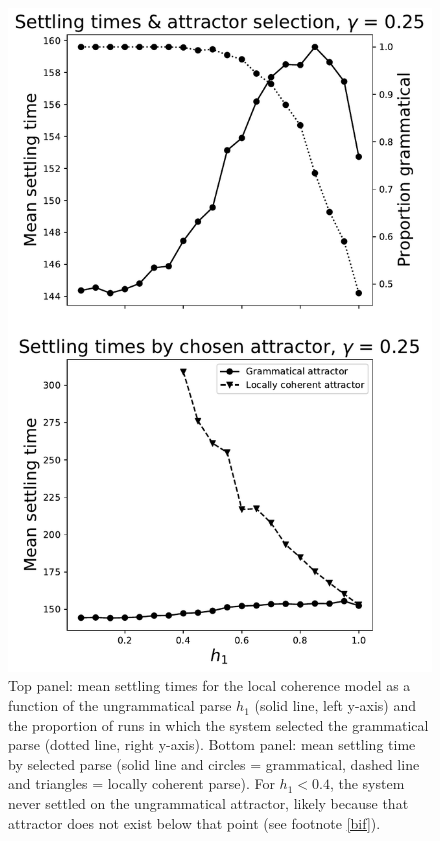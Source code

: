 \documentclass[10pt,letterpaper]{article}
\begin{document}
\begin{figure}[h!]
\includegraphics[width=0.8\linewidth]{../Model/TimesAsFnOfH1.pdf}
\centering
\caption{Top panel: mean settling times for the local coherence model as a function of the ungrammatical parse $h_1$ (solid line, left y-axis) and the proportion of runs in which the system selected the grammatical parse (dotted line, right y-axis). Bottom panel: mean settling time by selected parse (solid line and circles = grammatical, dashed line and triangles = locally coherent parse). For $h_1 < 0.4$, the system never settled on the ungrammatical attractor,  likely because that attractor does not exist below that point (see footnote \ref{bif}).}
\label{fnofh1}
\end{figure}
\end{document}

